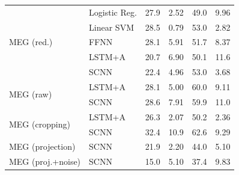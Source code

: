 \documentclass[utf8]{frontiersSCNS} %
\begin{document}
\begin{table}[htp]
{\begin{tabular}{l l| c | c | c | c}
    \midrule
    \multirow{5}{*}{MEG (red.)}
                     & Logistic Reg.        & 27.9 & 2.52  & 49.0 & 9.96 \\
                     & Linear SVM          & 28.5 & 0.79  & 53.0 & 2.82 \\
                     & FFNN                & 28.1 & 5.91  & 51.7 & 8.37 \\
                     & LSTM+A              & 20.7 & 6.90  & 50.1 & 11.6 \\
                     & SCNN                & 22.4 & 4.96  & 53.0 & 3.68 \\
    \midrule
    \multirow{2}{*}{MEG (raw)}
                         & LSTM+A              & 28.1 & 5.00 & 60.0 & 9.11 \\ 
                         & SCNN                & 28.6 & 7.91 & 59.9 & 11.0 \\
    \midrule
    \multirow{2}{*}{MEG (cropping)}
                         & LSTM+A              & 26.3 & 2.07 & 50.2 & 2.36 \\ 
                         & SCNN                & 32.4 & 10.9 & 62.6 & 9.29 \\
    \midrule
    \multirow{1}{*}{MEG (projection)}
                         & SCNN                & 21.9 & 2.20 & 44.0 & 5.10 \\
    \midrule
    \multirow{1}{*}{MEG (proj.+noise)}
                         & SCNN                & 15.0 & 5.10 & 37.4 & 9.83 \\
    \bottomrule
  \end{tabular}}
  \label{tab:seven_way_results}
\end{table}
\end{document}
